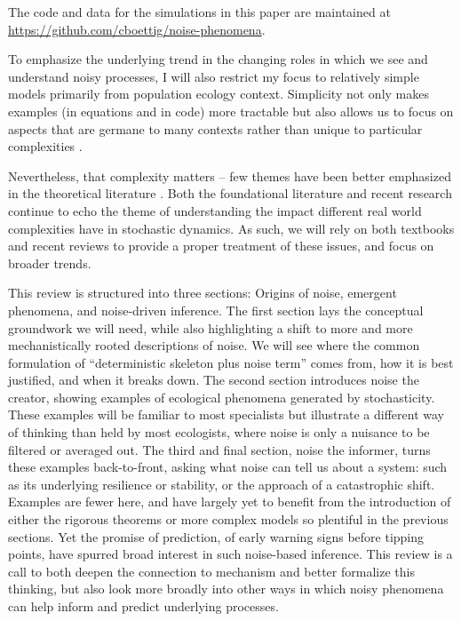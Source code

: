 \documentclass[
  authoryear,
  preprint,
  3p]{elsarticle}
\begin{document}
The code and data for the simulations in this paper are maintained at
\url{https://github.com/cboettig/noise-phenomena}.

To emphasize the underlying trend in the changing roles in which we see
and understand noisy processes, I will also restrict my focus to
relatively simple models primarily from population ecology context.
Simplicity not only makes examples (in equations and in code) more
tractable but also allows us to focus on aspects that are germane to
many contexts rather than unique to particular complexities
\citep{Levins1966, Bartlett1960}.

Nevertheless, that complexity matters -- few themes have been better
emphasized in the theoretical literature \citep{Bjornstad2001}. Both the
foundational literature and recent research continue to echo the theme
of understanding the impact different real world complexities have in
stochastic dynamics. As such, we will rely on both textbooks and recent
reviews to provide a proper treatment of these issues, and focus on
broader trends.

This review is structured into three sections: Origins of noise,
emergent phenomena, and noise-driven inference. The first section lays
the conceptual groundwork we will need, while also highlighting a shift
to more and more mechanistically rooted descriptions of noise. We will
see where the common formulation of ``deterministic skeleton plus noise
term'' comes from, how it is best justified, and when it breaks down.
The second section introduces noise the creator, showing examples of
ecological phenomena generated by stochasticity. These examples will be
familiar to most specialists but illustrate a different way of thinking
than held by most ecologists, where noise is only a nuisance to be
filtered or averaged out. The third and final section, noise the
informer, turns these examples back-to-front, asking what noise can tell
us about a system: such as its underlying resilience or stability, or
the approach of a catastrophic shift. Examples are fewer here, and have
largely yet to benefit from the introduction of either the rigorous
theorems or more complex models so plentiful in the previous sections.
Yet the promise of prediction, of early warning signs before tipping
points, have spurred broad interest in such noise-based inference. This
review is a call to both deepen the connection to mechanism and better
formalize this thinking, but also look more broadly into other ways in
which noisy phenomena can help inform and predict underlying processes.
\end{document}
